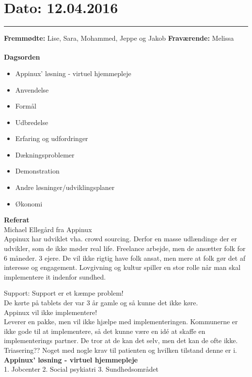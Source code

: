 

\section{Dato: 12.04.2016}
\hrule

\textbf{Fremmødte:} Lise, Sara, Mohammed, Jeppe og Jakob
\textbf{Fraværende:} Melissa 
\\
\\
\textbf{Dagsorden}
\begin{itemize}
	\item Appinux' løsning - virtuel hjemmepleje
	\item Anvendelse
	\item Formål
	\item Udbredelse
	\item Erfaring og udfordringer
	\item Dækningsproblemer
	\item Demonstration
	\item Andre løsninger/udviklingsplaner
	\item Økonomi
\end{itemize}

\textbf{Referat} 
\\
Michael Ellegård fra Appinux \\
Appinux har udviklet vha. crowd sourcing. Derfor en masse udlændinge der er udvikler, som de ikke møder real life. Freelance arbejde, men de ansætter folk for 6 måneder. 
3 ejere. De vil ikke rigtig have folk ansat, men mere at folk gør det af interesse og engagement. 
Lovgivning og kultur spiller en stor rolle når man skal implementere it indenfor sundhed.

Support:
Support er et kæmpe problem!\\
De kørte på tablets der var 3 år gamle og så kunne det ikke køre.\\
Appinux vil ikke implementere! \\
Leverer en pakke, men vil ikke hjælpe med implementeringen. 
Kommunerne er ikke gode til at implementere, så det kunne være en idé at skaffe en implementerings partner.
De tror at de kan det selv, men det kan de ofte ikke.\\
Triasering?? Noget med nogle krav til patienten og hvilken tilstand denne er i.
\\

\textbf{Appinux' løsning - virtuel hjemmepleje} 
\\
1. Jobcenter
2. Social psykiatri
3. Sundhedsområdet

